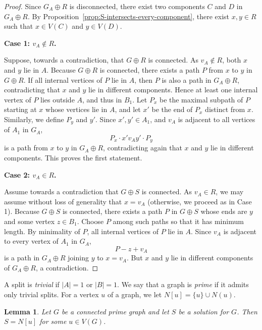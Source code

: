 \documentclass[11pt]{article}
\newtheorem{lemma}[theorem]{Lemma}
\theoremstyle{definition}
\begin{document}
\begin{proof}

Since $G_A \oplus R$ is disconnected, 
there exist two components $C$ and $D$ in $G_A \oplus R$.
By Proposition~\ref{prop:S-intersects-every-component}, 
there exist $x,y \in R$ such that $x \in V(C)$ and $y \in V(D)$.

\textbf{Case 1: $v_A \notin R$.}

Suppose, towards a contradiction, that $G \oplus R$ is connected.
As $v_A \notin R$, both $x$ and $y$ lie in $A$.
Because $G \oplus R$ is connected, there exists a path $P$ from $x$ to $y$ in $G \oplus R$.
If all internal vertices of $P$ lie in $A$, then $P$ is also a path in $G_A \oplus R$, contradicting that $x$ and $y$ lie in different components.  
Hence at least one internal vertex of $P$ lies outside $A$, and thus in $B_1$.
Let $P_x$ be the maximal subpath of $P$ starting at $x$ whose vertices lie in $A$,  
and let $x'$ be the end of $P_x$ distinct from $x$.
Similarly, we define $P_y$ and $y'$.  
Since $x',y'\in A_1$, and $v_A$ is adjacent to all vertices of $A_1$ in $G_A$, 
\[
    P_x \cdot x' v_A y' \cdot P_y
\]
is a path from $x$ to $y$ in $G_A \oplus R$, contradicting again that $x$ and $y$ lie in different components.
This proves the first statement.

\medskip
\textbf{Case 2: $v_A \in R$.}

Assume towards a contradiction that $G \oplus S$ is connected.
As $v_A \in R$, we may assume without loss of generality that $x = v_A$ (otherwise, we proceed as in Case 1).
Because $G \oplus S$ is connected, there exists a path $P$ in $G \oplus S$ whose ends are $y$ and some vertex $z \in B_1$.
Choose $P$ among such paths so that it has minimum length.
By minimality of $P$, all internal vertices of $P$ lie in $A$.
Since $v_A$ is adjacent to every vertex of $A_1$ in $G_A$, 
\[
    P - z + v_A
\]
is a path in $G_A \oplus R$ joining $y$ to $x=v_A$.
But $x$ and $y$ lie in different components of $G_A \oplus R$, a contradiction. %
\end{proof}

A split is \emph{trivial} if $|A|=1$ or $|B|=1$.
We say that a graph is \emph{prime} if it admits only trivial splits.
For a vertex $u$ of a graph, we let $N[u] = \{u\} \cup N(u)$.

\begin{lemma}\label{lemma:split-prime}
Let $G$ be a connected prime graph and let $S$ be a solution for $G$.
Then $S = N[u]$ for some $u \in V(G)$.
\end{lemma}
\end{document}
